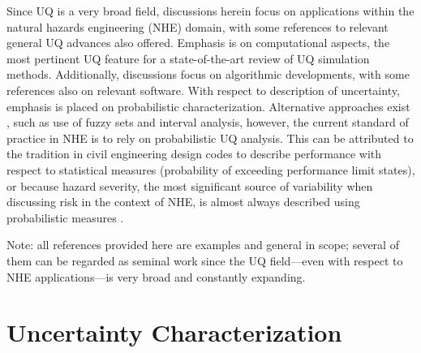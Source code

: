 Since UQ is a very broad field, discussions herein focus on applications within the natural hazards engineering (NHE) domain, with some references to relevant general UQ advances also offered. Emphasis is on computational aspects, the most pertinent UQ feature for a state-of-the-art review of UQ simulation methods. Additionally, discussions focus on algorithmic developments, with some references also on relevant software. With respect to description of uncertainty, emphasis is placed on probabilistic characterization. Alternative approaches exist \citep{beer2013imprecise}, such as use of fuzzy sets and interval analysis, however, the current standard of practice in NHE is to rely on probabilistic UQ analysis. This can be attributed to the tradition in civil engineering design codes to describe performance with respect to statistical measures (probability of exceeding performance limit states), or because hazard severity, the most significant source of variability when discussing risk in the context of NHE, is almost always described using probabilistic measures \citep{mcguire2004seismic, resio2007white}. 

Note: all references provided here are examples and general in scope; several of them can be regarded as seminal work since the UQ field---even with respect to NHE applications---is very broad and constantly expanding.    

\section{Uncertainty Characterization}
\label{sec:uq_characterization}

